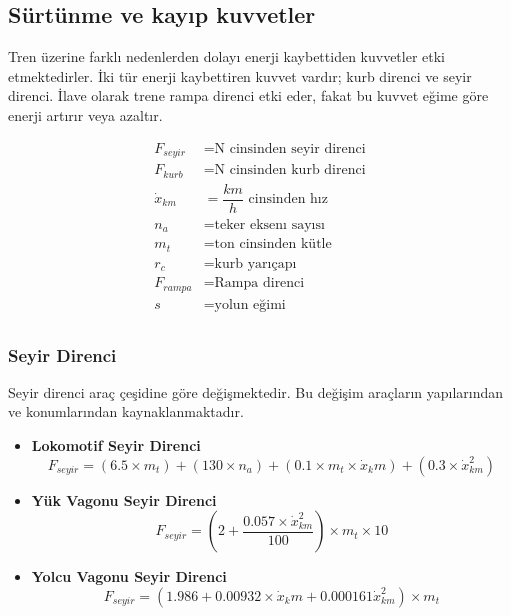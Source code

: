 \documentclass[10pt,a4paper]{article}
\begin{document}
\subsection{Sürtünme ve kayıp kuvvetler}
Tren üzerine farklı nedenlerden dolayı enerji kaybettiden kuvvetler etki etmektedirler. İki tür enerji kaybettiren kuvvet vardır; kurb direnci ve seyir direnci. İlave olarak trene rampa direnci etki eder, fakat bu kuvvet eğime göre enerji artırır veya azaltır.

\begin{align}
F_{seyir} &= \text{N cinsinden seyir direnci}  \nonumber \\
F_{kurb} &= \text{N cinsinden kurb direnci}  \nonumber \\
\dot{x}_{km} &= \dfrac{km}{h} \text{ cinsinden hız}  \nonumber \\
n_a &= \text{teker eksenı sayısı} \nonumber \\
m_t &= \text{ton cinsinden kütle} \nonumber \\
r_c &= \text{kurb yarıçapı} \nonumber \\
F_{rampa} &= \text{Rampa direnci} \nonumber \\
s &= \text{yolun eğimi} \nonumber \\
\end{align}

\subsubsection{Seyir Direnci}
Seyir direnci araç çeşidine göre değişmektedir. Bu değişim araçların yapılarından ve konumlarından kaynaklanmaktadır.
\begin{itemize}
\item \textbf{Lokomotif Seyir Direnci}
\begin{equation}
F_{seyir} = (6.5 \times m_t) + (130 \times n_a) + (0.1 \times m_t \times \dot{x}_km) + (0.3 \times \dot{x}^2_{km})
\end{equation}

\item \textbf{Yük Vagonu Seyir Direnci}
\begin{equation}
F_{seyir} = (2 + \dfrac{0.057 \times \dot{x}^2_{km} }{100})\times m_t \times 10
\end{equation}

\item \textbf{Yolcu Vagonu Seyir Direnci}
\begin{equation}
F_{seyir} = (1.986 + 0.00932 \times \dot{x}_km + 0.000161 \dot{x}^2_{km}) \times m_t
\end{equation}
\end{itemize}
\end{document}
